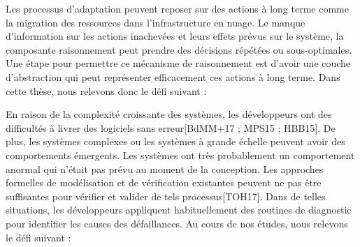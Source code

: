 %
Les processus d'adaptation peuvent reposer sur des actions à long terme comme la migration des ressources dans l'infrastructure en nuage. Le manque d'information sur les actions inachevées et leurs effets prévus sur le système, la composante raisonnement peut prendre des décisions répétées ou sous-optimales. Une étape pour permettre ce mécanisme de raisonnement est d'avoir une couche d'abstraction qui peut représenter efficacement ces actions à long terme. Dans cette thèse, nous relevons donc le défi suivant :
\vspace{-2em}


%
En raison de la complexité croissante des systèmes, les développeurs ont des difficultés à livrer des logiciels sans erreur[BdMM+17 ; MPS15 ; HBB15]. De plus, les systèmes complexes ou les systèmes à grande échelle peuvent avoir des comportements émergents. Les systèmes ont très probablement un comportement anormal qui n'était pas prévu au moment de la conception. Les approches formelles de modélisation et de vérification existantes peuvent ne pas être suffisantes pour vérifier et valider de tels processus[TOH17]. Dans de telles situations, les développeurs appliquent habituellement des routines de diagnostic pour identifier les causes des défaillances. Au cours de nos études, nous relevons le défi suivant :
\vspace{-2em}
